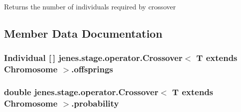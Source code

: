 \begin{DoxyReturn}{Returns}
the number of individuals required by crossover 
\end{DoxyReturn}


\subsection{Member Data Documentation}
\hypertarget{classjenes_1_1stage_1_1operator_1_1_crossover_3_01_t_01extends_01_chromosome_01_4_ac25f80174c265f930c316c2fb4bc7c5c}{
\subsubsection[{offsprings}]{\setlength{\rightskip}{0pt plus 5cm}Individual \mbox{[}$\,$\mbox{]} jenes.\-stage.\-operator.\-Crossover$<$ T extends Chromosome $>$.offsprings\hspace{0.3cm}{\ttfamily [private]}}}\label{classjenes_1_1stage_1_1operator_1_1_crossover_3_01_t_01extends_01_chromosome_01_4_ac25f80174c265f930c316c2fb4bc7c5c}
\hypertarget{classjenes_1_1stage_1_1operator_1_1_crossover_3_01_t_01extends_01_chromosome_01_4_a2b4aec7312a223ba84862f7848b14542}{
\subsubsection[{probability}]{\setlength{\rightskip}{0pt plus 5cm}double jenes.\-stage.\-operator.\-Crossover$<$ T extends Chromosome $>$.probability\hspace{0.3cm}{\ttfamily [protected]}}}\label{classjenes_1_1stage_1_1operator_1_1_crossover_3_01_t_01extends_01_chromosome_01_4_a2b4aec7312a223ba84862f7848b14542}
